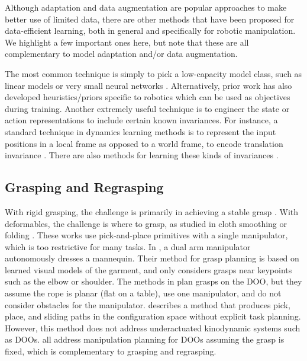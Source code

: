 Although adaptation and data augmentation are popular approaches to make better use of limited data, there are other methods that have been proposed for data-efficient learning, both in general and specifically for robotic manipulation. We highlight a few important ones here, but note that these are all complementary to model adaptation and/or data augmentation.

The most common technique is simply to pick a low-capacity model class, such as linear models or very small neural networks \cite{LinearAlarcon2013,TAMPC2021}. Alternatively, prior work has also developed heuristics/priors specific to robotics \cite{RoboticPriors2015} which can be used as objectives during training. Another extremely useful technique is to engineer the state or action representations to include certain known invariances. For instance, a standard technique in dynamics learning methods is to represent the input positions in a local frame as opposed to a world frame, to encode translation invariance \cite{Propnet,EquivariantTransporter2022,ZhuEquivariant2022}. There are also methods for learning these kinds of invariances \cite{TAMPC2021}.

\subsection{Grasping and Regrasping}
With rigid grasping, the challenge is primarily in achieving a stable grasp \cite{DexNet1,DexNet2}. With deformables, the challenge is where to grasp, as studied in cloth smoothing or folding \cite{HoqueCloth2020,ZixuanCloth21,ClothSmoothingWu}. These works use pick-and-place primitives with a single manipulator, which is too restrictive for many tasks. In \cite{Zhang2022}, a dual arm manipulator autonomously dresses a mannequin. Their method for grasp planning is based on learned visual models of the garment, and only considers grasps near keypoints such as the elbow or shoulder. The methods in \cite{RitaCableRouting,Nair2017,CFM} plan grasps on the DOO, but they assume the rope is planar (flat on a table), use one manipulator, and do not consider obstacles for the manipulator. \cite{Simeon04} describes a method that produces pick, place, and sliding paths in the configuration space without explicit task planning. However, this method does not address underactuated kinodynamic systems such as DOOs. \cite{TetheredToolManipulation, UnreliableDale2019, OfflineOnline22, Smolentsev2023ShapeVS, YuZL22, GlobalAdapt22}  all address manipulation planning for DOOs assuming the grasp is fixed, which is complementary to grasping and regrasping.

